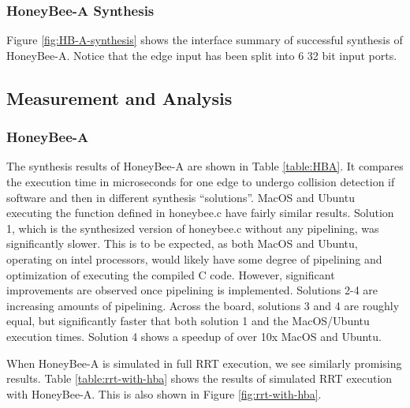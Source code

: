         \subsubsection*{HoneyBee-A Synthesis}
        Figure \ref{fig:HB-A-synthesis} shows the interface summary of successful synthesis of HoneyBee-A. Notice that the edge input has been split into 6 32 bit input ports. 
        
    
    \subsection{Measurement and Analysis}
        \subsubsection*{HoneyBee-A}
            The synthesis results of HoneyBee-A are shown in Table \ref{table:HBA}. It compares the execution time in microseconds for one edge to undergo collision detection if software and then in different synthesis ``solutions''. MacOS and Ubuntu executing the function defined in honeybee.c have fairly similar results. Solution 1, which is the synthesized version of honeybee.c without any pipelining, was significantly slower. This is to be expected, as both MacOS and Ubuntu, operating on intel processors, would likely have some degree of pipelining and optimization of executing the compiled C code. However, significant improvements are observed once pipelining is implemented. Solutions 2-4 are increasing amounts of pipelining. Across the board, solutions 3 and 4 are roughly equal, but significantly faster that both solution 1 and the MacOS/Ubuntu execution times. Solution 4 shows a speedup of over 10x MacOS and Ubuntu.
            

            When HoneyBee-A is simulated in full \ac{RRT} execution, we see similarly promising results. Table \ref{table:rrt-with-hba} shows the results of simulated RRT execution with HoneyBee-A. This is also shown in Figure \ref{fig:rrt-with-hba}.
            
            

